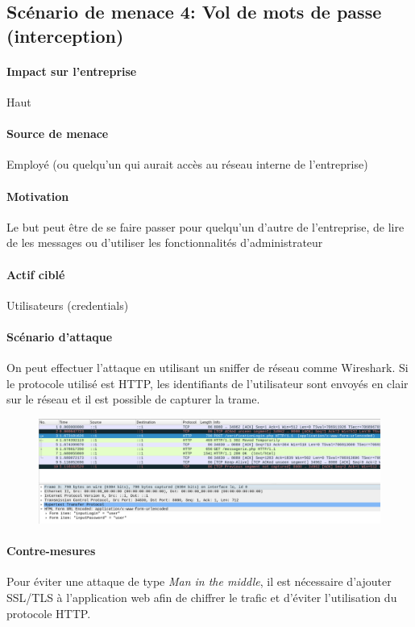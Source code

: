 \documentclass[a4paper,10pt]{article}
\begin{document}
    \subsection*{Scénario de menace 4: Vol de mots de passe (interception)}
        \paragraph{Impact sur l'entreprise} Haut
        \paragraph{Source de menace} Employé (ou quelqu’un qui aurait accès au réseau interne de l’entreprise)
        \paragraph{Motivation} Le but peut être de se faire passer pour quelqu’un d’autre de l’entreprise, de lire de les messages ou d’utiliser les fonctionnalités d’administrateur
        \paragraph{Actif ciblé} Utilisateurs (credentials)
        \paragraph{Scénario d'attaque} On peut effectuer l’attaque en utilisant un sniffer de réseau comme Wireshark. Si le protocole utilisé est HTTP, les identifiants de l’utilisateur sont envoyés en clair sur le réseau et il est possible de capturer la trame.
        \begin{figure}[H]
        \includegraphics[scale=0.35]{scenario4_1.png}
        \centering
        \end{figure}
        \paragraph{Contre-mesures}
         Pour éviter une attaque de type \textit{Man in the middle}, il est nécessaire d'ajouter SSL/TLS à l'application web afin de chiffrer le trafic et d'éviter l'utilisation du protocole HTTP.
\end{document}
